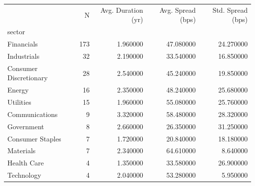 \begin{tabular}{lrrrr}
\toprule
 & N & Avg. Duration (yr) & Avg. Spread (bps) & Std. Spread (bps) \\
sector &  &  &  &  \\
\midrule
Financials & 173 & 1.960000 & 47.080000 & 24.270000 \\
Industrials & 32 & 2.190000 & 33.540000 & 16.850000 \\
Consumer Discretionary & 28 & 2.540000 & 45.240000 & 19.850000 \\
Energy & 16 & 2.350000 & 48.240000 & 25.680000 \\
Utilities & 15 & 1.960000 & 55.080000 & 25.760000 \\
Communications & 9 & 3.320000 & 58.480000 & 28.320000 \\
Government & 8 & 2.660000 & 26.350000 & 31.250000 \\
Consumer Staples & 7 & 1.720000 & 20.840000 & 18.180000 \\
Materials & 7 & 2.340000 & 64.610000 & 8.640000 \\
Health Care & 4 & 1.350000 & 33.580000 & 26.900000 \\
Technology & 4 & 2.040000 & 53.280000 & 5.950000 \\
\bottomrule
\end{tabular}
